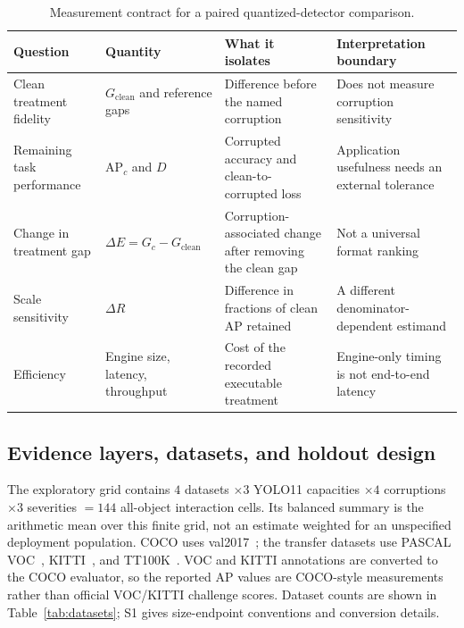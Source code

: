 \documentclass[a4paper,fleqn]{cas-dc}
\newcommand{\AP}{\mathrm{AP}}
\begin{document}
\begin{table}[t]
\centering
\caption{Measurement contract for a paired quantized-detector comparison.}
\label{tab:measurement-contract}
\small
\setlength{\tabcolsep}{4pt}
\begin{tabular}{Y{2.7cm}Y{3.0cm}Y{4.3cm}Y{4.1cm}}
\toprule
Question & Quantity & What it isolates & Interpretation boundary\\
\midrule
Clean treatment fidelity & $G_{\mathrm{clean}}$ and reference gaps & Difference before the named corruption & Does not measure corruption sensitivity\\
Remaining task performance & $\AP_c$ and $D$ & Corrupted accuracy and clean-to-corrupted loss & Application usefulness needs an external tolerance\\
Change in treatment gap & $\Delta E=G_c-G_{\mathrm{clean}}$ & Corruption-associated change after removing the clean gap & Not a universal format ranking\\
Scale sensitivity & $\Delta R$ & Difference in fractions of clean AP retained & A different denominator-dependent estimand\\
Efficiency & Engine size, latency, throughput & Cost of the recorded executable treatment & Engine-only timing is not end-to-end latency\\
\bottomrule
\end{tabular}
\end{table}

\subsection{Evidence layers, datasets, and holdout design}
\label{sec:evidence-layers}
\label{sec:datasets}
\label{sec:training}

The exploratory grid contains $4$ datasets $\times3$ YOLO11 capacities $\times4$ corruptions $\times3$ severities $=144$ all-object interaction cells. Its balanced summary is the arithmetic mean over this finite grid, not an estimate weighted for an unspecified deployment population. COCO uses val2017~\citep{lin2014coco}; the transfer datasets use PASCAL VOC~\citep{everingham2015voc}, KITTI~\citep{geiger2012kitti}, and TT100K~\citep{zhu2016tt100k}. VOC and KITTI annotations are converted to the COCO evaluator, so the reported AP values are COCO-style measurements rather than official VOC/KITTI challenge scores. Dataset counts are shown in Table~\ref{tab:datasets}; S1 gives size-endpoint conventions and conversion details.
\end{document}
